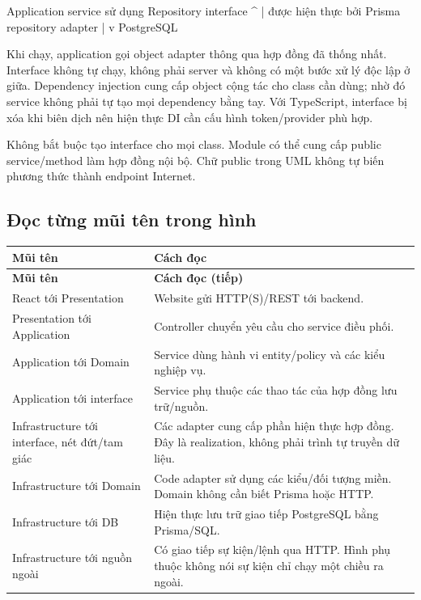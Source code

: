 \documentclass[12pt,a4paper]{article}
\newenvironment{PairTable}[2]{%
  \begin{longtable}{|L{39mm}|L{106mm}|}\hline
  \textbf{#1} & \textbf{#2}\\\hline\endfirsthead
  \hline\textbf{#1} & \textbf{#2 (tiếp)}\\\hline\endhead
}{\end{longtable}}
\begin{document}
\begin{Flow}
Application service sử dụng Repository interface
                              ^
                              | được hiện thực bởi
                       Prisma repository adapter
                              |
                              v
                         PostgreSQL
\end{Flow}

Khi chạy, application gọi object adapter thông qua hợp đồng đã thống nhất. Interface không tự chạy, không phải server và không có một bước xử lý độc lập ở giữa. Dependency injection cung cấp object cộng tác cho class cần dùng; nhờ đó service không phải tự tạo mọi dependency bằng tay. Với TypeScript, interface bị xóa khi biên dịch nên hiện thực DI cần cấu hình token/provider phù hợp.

Không bắt buộc tạo interface cho mọi class. Module có thể cung cấp public service/method làm hợp đồng nội bộ. Chữ public trong UML không tự biến phương thức thành endpoint Internet.

\subsection{Đọc từng mũi tên trong hình}
\begin{PairTable}{Mũi tên}{Cách đọc}
React tới Presentation & Website gửi HTTP(S)/REST tới backend.\\\hline
Presentation tới Application & Controller chuyển yêu cầu cho service điều phối.\\\hline
Application tới Domain & Service dùng hành vi entity/policy và các kiểu nghiệp vụ.\\\hline
Application tới interface & Service phụ thuộc các thao tác của hợp đồng lưu trữ/nguồn.\\\hline
Infrastructure tới interface, nét đứt/tam giác & Các adapter cung cấp phần hiện thực hợp đồng. Đây là realization, không phải trình tự truyền dữ liệu.\\\hline
Infrastructure tới Domain & Code adapter sử dụng các kiểu/đối tượng miền. Domain không cần biết Prisma hoặc HTTP.\\\hline
Infrastructure tới DB & Hiện thực lưu trữ giao tiếp PostgreSQL bằng Prisma/SQL.\\\hline
Infrastructure tới nguồn ngoài & Có giao tiếp sự kiện/lệnh qua HTTP. Hình phụ thuộc không nói sự kiện chỉ chạy một chiều ra ngoài.\\\hline
\end{PairTable}
\end{document}
